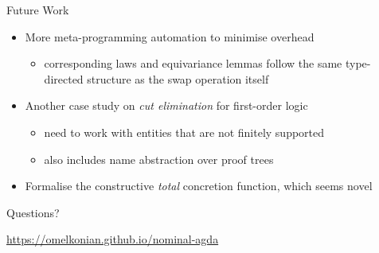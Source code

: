 \documentclass[aspectratio=169]{beamer}
\renewcommand\alert[1]{\textcolor{mLightBrown}{#1}}
\begin{document}
\begin{frame}{Future Work}
\begin{itemize}
\item More meta-programming automation to minimise overhead
  \begin{itemize}
  \item corresponding laws and equivariance lemmas follow the same type-directed structure
 as the swap operation itself
  \end{itemize}
\item Another case study on \emph{cut elimination} for first-order logic
  \begin{itemize}
  \item need to work with entities that are not finitely supported
  \item also includes name abstraction over proof trees
  \end{itemize}
\item Formalise the constructive \emph{total} concretion function, which seems novel
\end{itemize}
\end{frame}

\begin{frame}[standout]
Questions?
\vfill
\begin{center}
\alert{\url{https://omelkonian.github.io/nominal-agda}}
\end{center}
\end{frame}
\end{document}
